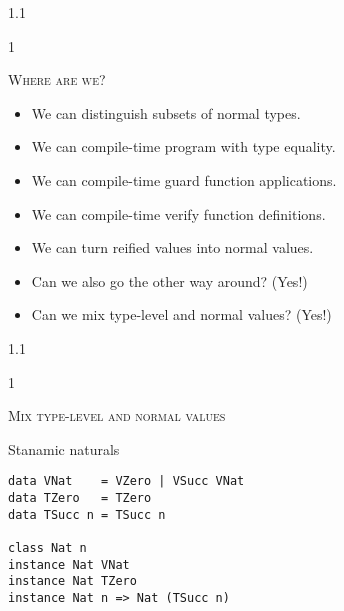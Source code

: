 \documentclass{slides}
\newcommand{\header}[1]{{\large\scshape \color{Red} #1} \medskip }
\newcommand{\blau}[1]{{\color{Blue} #1} \medskip }
\newenvironment{myslide}{\begin{slide}\color{Blue}\begin{boxedminipage}{1.1\hsize}\begin{boxedminipage}{1\hsize}\color{Black}
\vspace{-170\in}
}{%
\smallskip
\end{boxedminipage}
\end{boxedminipage}
\end{slide}}
\begin{document}
\begin{myslide}

\header{Where are we?}

\begin{itemize}
\item We can distinguish subsets of normal types.
\item We can compile-time program with type equality.
\item We can compile-time guard function applications.
\item We can compile-time verify function definitions.
\item We can turn reified values into normal values.
\item Can we also go the other way around? (Yes!)
\item Can we mix type-level and normal values? (Yes!)
\end{itemize}

\end{myslide}






\begin{myslide}

\header{Mix type-level and normal values}

\blau{Stanamic naturals}

\begin{Verbatim}[fontseries=normal,fontsize=\small]
data VNat    = VZero | VSucc VNat
data TZero   = TZero
data TSucc n = TSucc n

class Nat n
instance Nat VNat
instance Nat TZero
instance Nat n => Nat (TSucc n)
\end{Verbatim}

\end{myslide}



\end{document}

